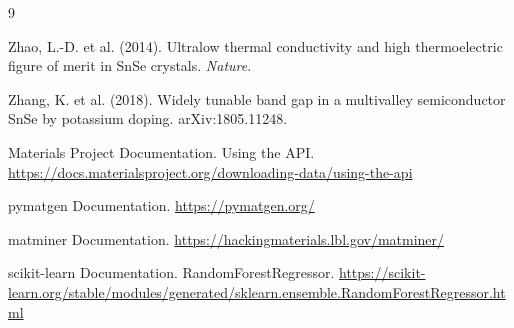 \documentclass[11pt,a4paper]{article}
\begin{document}
\begin{thebibliography}{9}

Zhao, L.-D. et al. (2014).
\newblock Ultralow thermal conductivity and high thermoelectric figure of merit in SnSe crystals.
\newblock \emph{Nature}.

Zhang, K. et al. (2018).
\newblock Widely tunable band gap in a multivalley semiconductor SnSe by potassium doping.
\newblock arXiv:1805.11248.

Materials Project Documentation.
\newblock Using the API.
\newblock \url{https://docs.materialsproject.org/downloading-data/using-the-api}

pymatgen Documentation.
\newblock \url{https://pymatgen.org/}

matminer Documentation.
\newblock \url{https://hackingmaterials.lbl.gov/matminer/}

scikit-learn Documentation.
\newblock RandomForestRegressor.
\newblock \url{https://scikit-learn.org/stable/modules/generated/sklearn.ensemble.RandomForestRegressor.html}

\end{thebibliography}
\end{document}
